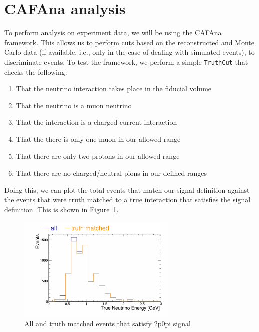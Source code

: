 \documentclass{article}
\begin{document}
\section{CAFAna analysis}

To perform analysis on experiment data, we will be using the CAFAna framework. This allows us to perform cuts based on the reconstructed and Monte Carlo data (if available, i.e., only in the case of dealing with simulated events), to discriminate events. To test the framework, we perform a simple \verb|TruthCut| that checks the following:
\begin{enumerate}[label=(\roman*)]
    \item That the neutrino interaction takes place in the fiducial volume
    \item That the neutrino is a muon neutrino
    \item That the interaction is a charged current interaction
    \item That the there is only one muon in our allowed range
    \item That there are only two protons in our allowed range
    \item That there are no charged/neutral pions in our defined ranges
\end{enumerate}
Doing this, we can plot the total events that match our signal definition against the events that were truth matched to a true interaction that satisfies the signal definition. This is shown in Figure~\ref{fig:truth-match-signal-def}.


\begin{figure}
    \centering
    \includegraphics[width=3in]{Figs/CAFAna/EnergyTruthMatch.png}
    \caption{All and truth matched events that satisfy 2p0pi signal}
    \label{fig:truth-match-signal-def}
\end{figure}
\end{document}

